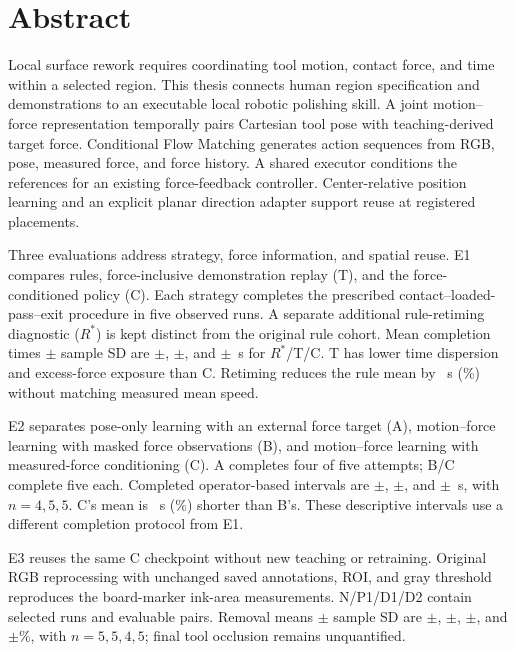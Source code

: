 \chapter*{Abstract}
\begin{center}\fontsize{16}{21}\selectfont\bfseries\thesistitle\end{center}

Local surface rework requires coordinating tool motion, contact force, and time within a selected region. This thesis connects human region specification and demonstrations to an executable local robotic polishing skill. A joint motion--force representation temporally pairs Cartesian tool pose with teaching-derived target force. Conditional Flow Matching generates action sequences from RGB, pose, measured force, and force history. A shared executor conditions the references for an existing force-feedback controller. Center-relative position learning and an explicit planar direction adapter support reuse at registered placements.

Three evaluations address strategy, force information, and spatial reuse. E1 compares rules, force-inclusive demonstration replay (T), and the force-conditioned policy (C). Each strategy completes the prescribed contact--loaded-pass--exit procedure in five observed runs. A separate additional rule-retiming diagnostic (\(R^{*}\)) is kept distinct from the original rule cohort. Mean completion times \(\pm\) sample SD are \EoneRstarTime\(\pm\)\EoneRstarTimeSD, \EoneTTime\(\pm\)\EoneTTimeSD, and \EoneCTime\(\pm\)\EoneCTimeSD~s for \(R^{*}\)/T/C. T has lower time dispersion and excess-force exposure than C. Retiming reduces the rule mean by \RstarTimeGain~s (\RstarTimePercent\%) without matching measured mean speed.

E2 separates pose-only learning with an external force target (A), motion--force learning with masked force observations (B), and motion--force learning with measured-force conditioning (C). A completes four of five attempts; B/C complete five each. Completed operator-based intervals are \EtwoATime\(\pm\)\EtwoATimeSD, \EtwoBTime\(\pm\)\EtwoBTimeSD, and \EtwoCTime\(\pm\)\EtwoCTimeSD~s, with \(n=4,5,5\). C's mean is \BCSeconds~s (\BCPercent\%) shorter than B's. These descriptive intervals use a different completion protocol from E1.

E3 reuses the same C checkpoint without new teaching or retraining. Original RGB reprocessing with unchanged saved annotations, ROI, and gray threshold reproduces the board-marker ink-area measurements. N/P1/D1/D2 contain \EthreeMainN{} selected runs and \EthreeImageN{} evaluable pairs. Removal means \(\pm\) sample SD are \EthreeNRemoval\(\pm\)\EthreeNSD, \EthreePoneRemoval\(\pm\)\EthreePoneSD, \EthreeDoneRemoval\(\pm\)\EthreeDoneSD, and \EthreeDtwoRemoval\(\pm\)\EthreeDtwoSD\%, with \(n=5,5,4,5\); final tool occlusion remains unquantified.

